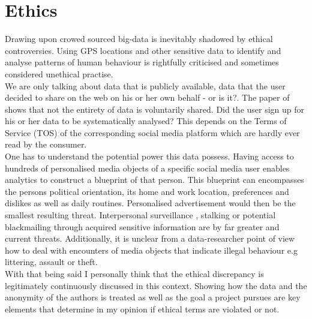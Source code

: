 \chapter*{Ethics}

Drawing upon crowed sourced big-data is inevitably shadowed by ethical controversies. Using GPS locations and other sensitive data to identify and analyse patterns of human behaviour is rightfully criticised and sometimes considered unethical practise.\\
We are only talking about data that is publicly available, data that the user decided to share on the web on his or her own behalf - or is it?. The paper of \parencite{Estima2016} shows that not the entirety of data is voluntarily shared. Did the user sign up for his or her data to be systematically analysed? This depends on the Terms of Service (TOS) of the corresponding social media platform which are hardly ever read by the consumer.\\
One has to understand the potential power this data possess. Having access to hundreds of personalised media objects of a specific social media user enables analytics to construct a blueprint of that person. This blueprint can encompasses the persons political orientation, its home and work location, preferences and dislikes as well as daily routines. Personalised advertisement would then be the smallest resulting threat. Interpersonal surveillance \parencite{Trottier2017}, stalking \parencite{Lyndon2011} or potential blackmailing through acquired sensitive information are by far greater and current threats. Additionally, it is unclear from a data-researcher point of view how to deal with encounters of media objects that indicate illegal behaviour e.g littering, assault or theft.\\

With that being said I personally think that the ethical discrepancy is legitimately continuously discussed in this context. Showing how the data and the anonymity of the authors is treated as well as the goal a project pursues are key elements that determine in my opinion if ethical terms are violated or not. 





